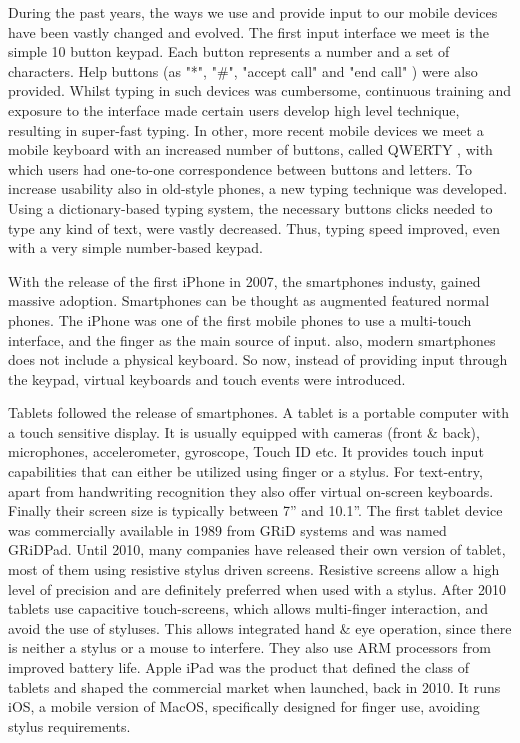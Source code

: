 During the past years, the ways we use and provide input to our mobile devices have been vastly changed and evolved. The first input interface we meet is the simple 10 button keypad. Each button represents a number and a set of characters. Help buttons (as "*", "\#", "accept call" and "end call" ) were also provided. Whilst typing in such devices was cumbersome, continuous training and exposure to the interface made certain users develop high level technique, resulting in super-fast typing. 
In other, more recent mobile devices we meet a mobile keyboard with an increased number of buttons, called QWERTY \cite{qwerty}, with which users had one-to-one correspondence between buttons and letters.
To increase usability also in old-style phones, a new typing technique was developed. Using a dictionary-based typing system, the necessary buttons clicks needed to type any kind of text, were vastly decreased. Thus, typing speed improved, even with a very simple number-based keypad. 

With the release of the first iPhone \cite{iphone} in 2007, the smartphones industy, gained massive adoption. Smartphones can be thought as augmented featured normal phones. The iPhone was one of the first mobile phones to use a multi-touch interface, and the finger as the main source of input. also, modern smartphones does not include a physical keyboard. 
So now, instead of providing input through the keypad, virtual keyboards and touch events were introduced. 

Tablets followed the release of smartphones. A tablet is a portable computer with a touch sensitive display. It is usually equipped with cameras (front \& back), microphones, accelerometer, gyroscope, Touch ID \cite{touchID} etc. It provides touch input capabilities that can either be utilized using finger or a stylus. For text-entry, apart from handwriting recognition they also offer virtual on-screen keyboards. Finally their screen size is typically between 7'' and 10.1''.
The first tablet device was commercially available in 1989 from GRiD systems and was named GRiDPad. Until 2010, many companies have released their own version of tablet, most of them using resistive stylus driven screens. Resistive screens allow a high level of precision and are definitely preferred when used with a stylus.
After 2010 tablets use capacitive touch-screens, which allows multi-finger interaction, and avoid the use of styluses. This allows integrated hand \& eye operation, since there is neither a stylus or a mouse to interfere. They also use ARM processors from improved battery life. Apple iPad was the product that defined the class of tablets and shaped the commercial market when launched, back in 2010. It runs iOS, a mobile version of MacOS, specifically designed for finger use, avoiding stylus requirements. 

